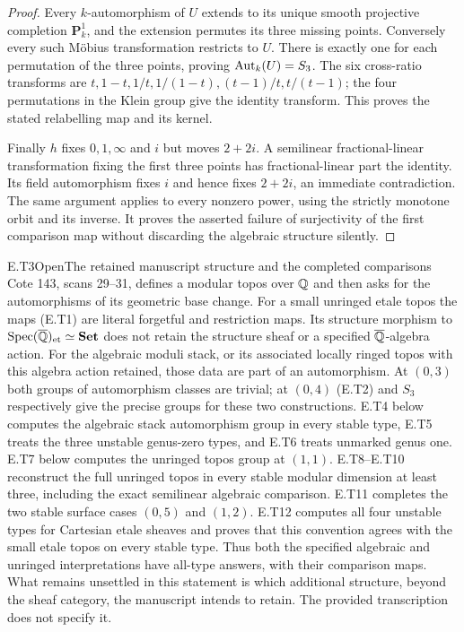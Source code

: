 \begin{proof}
Every $k$-automorphism of $U$ extends to its unique smooth
projective completion $\mathbf P^1_k$, and the extension
permutes its three missing points.  Conversely every such
M\"obius transformation restricts to $U$.  There is exactly one
for each permutation of the three points, proving $\operatorname{Aut}_k(U)=S_3$.
The six cross-ratio transforms are
$t,1-t,1/t,1/(1-t),(t-1)/t,t/(t-1)$; the four permutations in
the Klein group give the identity transform.  This proves the
stated relabelling map and its kernel.

Finally $h$ fixes $0,1,\infty$ and $i$ but moves $2+2i$.
A semilinear fractional-linear transformation fixing the first
three points has fractional-linear part the identity.  Its
field automorphism fixes $i$ and hence fixes $2+2i$, an immediate
contradiction.  The same argument applies to every nonzero power,
using the strictly monotone orbit and its inverse.  It proves
the asserted failure of surjectivity of the first comparison
map without discarding the algebraic structure silently.
\end{proof}

\begin{result}{E.T3}{Open}{The retained manuscript structure and the completed comparisons}
Cote 143, scans 29--31, defines a modular topos over $\mathbb Q$ and
then asks for the automorphisms of its geometric base change.
For a small unringed etale topos the maps (E.T1) are literal
forgetful and restriction maps.  Its structure morphism to
$\operatorname{Spec}(\overline{\mathbb Q})_{\mathrm{et}}\simeq\mathbf{Set}$
does not retain the structure sheaf or a specified
$\overline{\mathbb Q}$-algebra action.  For the algebraic moduli stack,
or its associated locally ringed topos with this algebra
action retained, those data are part of an automorphism.
At $(0,3)$ both groups of automorphism classes are trivial;
at $(0,4)$ (E.T2) and $S_3$ respectively give the precise groups
for these two constructions.  E.T4 below computes the algebraic
stack automorphism group in every stable type, E.T5 treats
the three unstable genus-zero types, and E.T6 treats unmarked
genus one.  E.T7 below computes the unringed topos group
at $(1,1)$.  E.T8--E.T10 reconstruct the full unringed
topos in every stable modular dimension at least three,
including the exact semilinear algebraic comparison.
E.T11 completes the two stable surface cases $(0,5)$ and
$(1,2)$.  E.T12 computes all four unstable types for Cartesian
etale sheaves and proves that this convention agrees with the
small etale topos on every stable type.  Thus both the specified
algebraic and unringed interpretations have all-type answers,
with their comparison maps.  What remains unsettled in this
statement is which additional structure, beyond the sheaf
category, the manuscript intends to retain.  The provided
transcription does not specify it.
\end{result}

